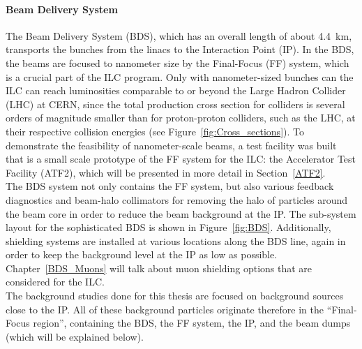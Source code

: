 \paragraph{Beam Delivery System}
The Beam Delivery System (BDS), which has an overall length of about \SI{4.4}{\kilo\meter}, transports the bunches from the linacs to the Interaction Point (IP).
In the BDS, the beams are focused to nanometer size by the Final-Focus (FF) system, which is a crucial part of the ILC program.
Only with nanometer-sized bunches can the ILC can reach luminosities comparable to or beyond the Large Hadron Collider (LHC) at CERN, since the total production cross section for \positron \electron colliders is several orders of magnitude smaller than for proton-proton colliders, such as the LHC, at their respective collision energies (see Figure~\ref{fig:Cross_sections}).
To demonstrate the feasibility of nanometer-scale beams, a test facility was built that is a small scale prototype of the FF system for the ILC: the Accelerator Test Facility (ATF2), which will be presented in more detail in Section~\ref{ATF2}.
\\The BDS system not only contains the FF system, but also various feedback diagnostics and beam-halo collimators for removing the halo of particles around the beam core in order to reduce the beam background at the IP. 
The sub-system layout for the sophisticated BDS is shown in Figure~\ref{fig:BDS}.
Additionally, shielding systems are installed at various locations along the BDS line, again in order to keep the background level at the IP as low as possible.
Chapter~\ref{BDS_Muons} will talk about muon shielding options that are considered for the ILC.
\\The background studies done for this thesis are focused on background sources close to the IP.
All of these background particles originate therefore in the ``Final-Focus region'', containing the BDS, the FF system, the IP, and the beam dumps (which will be explained below).

